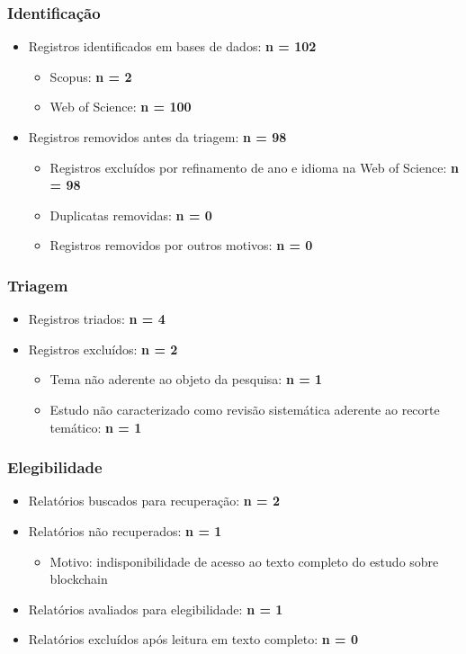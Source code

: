\documentclass[12pt]{article}
\begin{document}
\subsubsection{Identificação}
\label{sec:orga025a68}
\begin{itemize}
\item Registros identificados em bases de dados: \textbf{n = 102}
\begin{itemize}
\item Scopus: \textbf{n = 2}
\item Web of Science: \textbf{n = 100}
\end{itemize}

\item Registros removidos antes da triagem: \textbf{n = 98}
\begin{itemize}
\item Registros excluídos por refinamento de ano e idioma na Web of Science: \textbf{n = 98}
\item Duplicatas removidas: \textbf{n = 0}
\item Registros removidos por outros motivos: \textbf{n = 0}
\end{itemize}
\end{itemize}

\subsubsection{Triagem}
\label{sec:orgc016fd8}
\begin{itemize}
\item Registros triados: \textbf{n = 4}
\item Registros excluídos: \textbf{n = 2}
\begin{itemize}
\item Tema não aderente ao objeto da pesquisa: \textbf{n = 1}
\item Estudo não caracterizado como revisão sistemática aderente ao recorte temático: \textbf{n = 1}
\end{itemize}
\end{itemize}

\subsubsection{Elegibilidade}
\label{sec:org832b977}
\begin{itemize}
\item Relatórios buscados para recuperação: \textbf{n = 2}
\item Relatórios não recuperados: \textbf{n = 1}
\begin{itemize}
\item Motivo: indisponibilidade de acesso ao texto completo do estudo sobre blockchain
\end{itemize}

\item Relatórios avaliados para elegibilidade: \textbf{n = 1}
\item Relatórios excluídos após leitura em texto completo: \textbf{n = 0}
\end{itemize}
\end{document}
